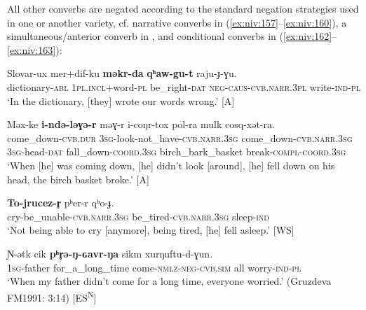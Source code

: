 \documentclass[output=paper,colorlinks,citecolor=brown]{langscibook}
\begin{document}
All other converbs are negated according to the standard negation strategies used in one or another variety, cf. narrative converbs in (\ref{ex:niv:157}--\ref{ex:niv:160}), a simultaneous/anterior converb in , and conditional converbs in (\ref{ex:niv:162}--\ref{ex:niv:163}):


\ea\label{ex:niv:158}
    \gll Slovar-ux mer+dif-ku \textbf{məkr-da} \textbf{qʰaw-gu-t} raju-ɟ{}-ɣu.\footnotemark{} \\ 
         dictionary{}-\textsc{abl} 1\textsc{pl}.\textsc{incl}+word-\textsc{pl} be\_right-\textsc{dat} \textsc{neg-caus-cvb.narr.3pl} write-\textsc{ind-pl} \\
    \glt ‘In the dictionary, [they] wrote our words wrong.’ \citep{Jushkina2019} [A]
\z{}

\ea\label{ex:niv:159}
    \gll Məx-ke \textbf{i-ndə-ləɣə-r}  məɣ-r i-coŋr-tox pol-ra  mulk cosq-xət-ra. \\ 
         come\_down-\textsc{cvb.dur} \textsc{3sg}{}-look-not\_have-\textsc{cvb.narr.3sg} come\_down-\textsc{cvb.narr.3sg} \textsc{3sg-}head-\textsc{dat} fall\_down-\textsc{coord.3sg} birch\_bark\_basket break-\textsc{compl-coord.3sg} \\
    \glt ‘When [he] was coming down, [he] didn’t look [around], [he] fell down on his head, the birch basket broke.’ \citep[227]{Panfilov1965} [A]
\z

\ea\label{ex:niv:160}
    \gll \textbf{To-jrucez-r̥} pʰer-r qʰo-ɟ. \\ 
         cry-be\_unable-\textsc{cvb.narr.3sg} be\_tired-\textsc{cvb.narr.3sg} sleep-\textsc{ind} \\
    \glt ‘Not being able to cry [anymore], being tired, [he] fell asleep.’ \citep[248]{Panfilov1965} [WS]
\z

\ea\label{ex:niv:161}
    \gll Ɲ-ətk cik \textbf{pʰr̥ə-ŋ-ɢavr-ŋa} sikm xurŋuftu-d-ɣun. \\ 
         \textsc{1sg}{}-father for\_a\_long\_time come-\textsc{nmlz-neg-cvb.sim} all worry-\textsc{ind-pl} \\
    \glt ‘When my father didn’t come for a long time, everyone worried.’ (Gruzdeva FM1991: 3:14) [ES\textsuperscript{N}]
\z
\end{document}
